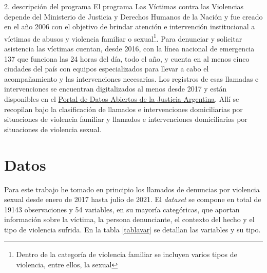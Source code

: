 \documentclass[10pt, spanish]{article}
\begin{document}
2. descripción del programa
El programa Las Víctimas contra las Violencias depende del Ministerio de Justicia y Derechos Humanos de la Nación y fue creado en el año 2006 con el objetivo de brindar atención e intervención institucional a víctimas de abusos y violencia familiar o sexual\footnote{Dentro de la categoría de violencia familiar se incluyen varios tipos de violencia, entre ellos, la sexual}. Para denunciar  y solicitar asistencia las víctimas cuentan, desde 2016, con la línea nacional de emergencia 137 que funciona las 24 horas del día, todo el año, y cuenta en al menos cinco ciudades del país con equipos especializados para llevar a cabo el acompañamiento y las intervenciones necesarias. Los registros de esas llamadas e intervenciones se encuentran digitalizados al menos desde 2017 y están disponibles en el \href{http://datos.jus.gob.ar/}{Portal de Datos Abiertos de la Justicia Argentina}. Allí se recopilan bajo la clasificación de llamados e intervenciones domiciliarias por situaciones de violencia familiar y llamados e intervenciones domiciliarias por situaciones de violencia sexual. 


\section{Datos}\label{datos}

Para este trabajo he tomado en principio los llamados de denuncias por violencia sexual desde enero de 2017 hasta julio de 2021. El \textit{dataset} se compone en total de 19143 observaciones y 54 variables, en su mayoría categóricas, que aportan información sobre la víctima, la persona denunciante, el contexto del hecho y el tipo de violencia sufrida. En la tabla \ref{tablavar} se detallan las variables y su tipo.
\end{document}
